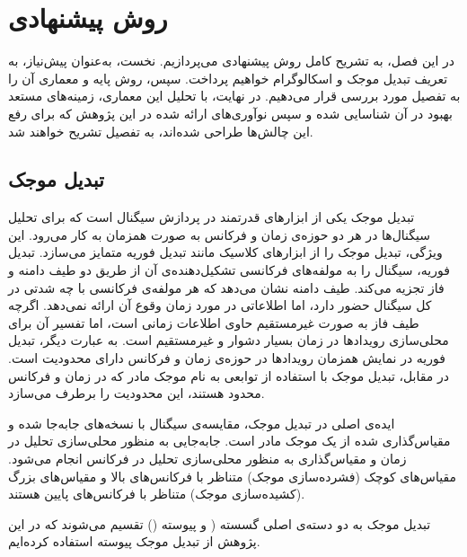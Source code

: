 \chapter{روش پیشنهادی}

در این فصل، به تشریح کامل روش پیشنهادی می‌پردازیم. نخست، به‌عنوان پیش‌نیاز، به تعریف تبدیل موجک و
اسکالوگرام
خواهیم پرداخت. سپس، روش پایه و معماری آن را به تفصیل مورد بررسی قرار می‌دهیم. در نهایت، با تحلیل این معماری، زمینه‌های مستعد بهبود در آن شناسایی شده و سپس نوآوری‌های ارائه شده در این پژوهش که برای رفع این چالش‌ها طراحی شده‌اند، به تفصیل تشریح خواهند شد.

\section{تبدیل موجک}

تبدیل موجک یکی از ابزارهای قدرتمند در پردازش سیگنال است که برای تحلیل سیگنال‌ها در هر دو حوزه‌ی زمان و فرکانس به صورت همزمان به کار می‌رود. این ویژگی، تبدیل موجک را از ابزارهای کلاسیک مانند
تبدیل فوریه
متمایز می‌سازد. تبدیل فوریه، سیگنال را به مولفه‌های فرکانسی تشکیل‌دهنده‌ی آن از طریق دو طیف دامنه و فاز تجزیه می‌کند. طیف دامنه نشان می‌دهد که هر مولفه‌ی فرکانسی با چه شدتی در کل سیگنال حضور دارد، اما اطلاعاتی در مورد زمان وقوع آن ارائه نمی‌دهد. اگرچه طیف فاز به صورت غیرمستقیم حاوی اطلاعات زمانی است، اما تفسیر آن برای محلی‌سازی رویدادها در زمان بسیار دشوار و غیرمستقیم است. به عبارت دیگر، تبدیل فوریه در نمایش همزمان رویدادها در حوزه‌ی زمان و فرکانس دارای محدودیت است. در مقابل، تبدیل موجک با استفاده از توابعی به نام
موجک مادر
که در زمان و فرکانس محدود هستند، این محدودیت را برطرف می‌سازد.

ایده‌ی اصلی در تبدیل موجک، مقایسه‌ی سیگنال با نسخه‌های جابه‌جا شده و مقیاس‌گذاری شده از یک موجک مادر است. جابه‌جایی به منظور محلی‌سازی تحلیل در زمان و مقیاس‌گذاری به منظور محلی‌سازی تحلیل در فرکانس انجام می‌شود. مقیاس‌های کوچک (فشرده‌سازی موجک) متناظر با فرکانس‌های بالا و مقیاس‌های بزرگ (کشیده‌سازی موجک) متناظر با فرکانس‌های پایین هستند.

تبدیل موجک به دو دسته‌ی اصلی گسسته (
و پیوسته ()
تقسیم می‌شوند که در این پژوهش از تبدیل موجک پیوسته استفاده کرده‌ایم.

